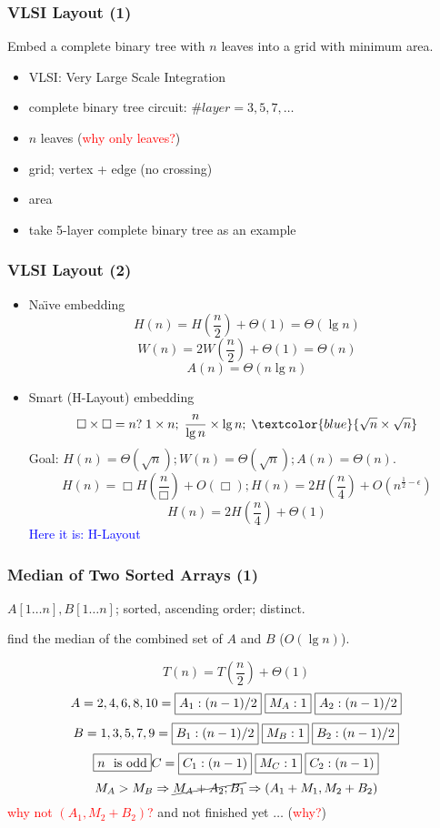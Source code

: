 \documentclass{beamer}
\begin{document}
\begin{frame}
  \frametitle{VLSI Layout (1)}
  
  \begin{Problem}
    Embed a complete binary tree with $n$ leaves into a grid with minimum area.
    \begin{itemize}
      \item VLSI: Very Large Scale Integration
      \item complete binary tree circuit: $\#layer = 3,5,7,\ldots$
      \item $n$ leaves (\textcolor{red}{why only leaves?})
      \item grid; vertex + edge (no crossing)
      \item area
      \item take 5-layer complete binary tree as an example
    \end{itemize}
  \end{Problem}
\end{frame}

\begin{frame}
  \frametitle{VLSI Layout (2)}
  
  \begin{itemize}
    \setlength{\itemsep}{0.50cm}
    \item Na\"{\i}ve embedding
     \[ H(n) = H(\frac{n}{2}) + \Theta(1) = \Theta(\lg n) \]
     \[ W(n) = 2W(\frac{n}{2}) + \Theta(1) = \Theta(n) \]
     \[ A(n) = \Theta(n \lg n) \]
    \item Smart (H-Layout) embedding
    \[ \Box \times \Box = n? \; 1 \times n;\; \frac{n}{\lg n} \times \lg n;\;
    \textcolor{blue}{\sqrt{n} \times \sqrt{n}}
    \]
    Goal: $H(n) = \Theta(\sqrt{n}); W(n) = \Theta(\sqrt{n}); A(n) = \Theta(n).$
    \[ 
      H(n) = \Box H(\frac{n}{\Box}) + O(\Box); H(n) = 2 H(\frac{n}{4}) +
      O(n^{\frac{1}{2} - \epsilon})
    \]
    \[ H(n) = 2H(\frac{n}{4}) + \Theta(1) \]
    \centering \textcolor{blue}{Here it is: H-Layout}
  \end{itemize}
\end{frame}

\begin{frame}
  \frametitle{Median of Two Sorted Arrays (1)}
  
  \begin{Problem}
    $A[1 \ldots n], B[1 \ldots n]$; sorted, ascending order; distinct.
    
    find the median of the combined set of $A$ and $B$ ($O(\lg n)$).
  \end{Problem}
  
  \[ T(n) = T(\frac{n}{2}) + \Theta(1) \]
  \[A = 2,4,6,8,10 = \fbox{$A_1: (n-1)/2$}\; \fbox{$M_A: 1$}\; \fbox{$A_2:
  (n-1)/2$} \] 
  \[B = 1,3,5,7,9 = \fbox{$B_1: (n-1)/2$}\; \fbox{$M_B: 1$}\; \fbox{$B_2:
  (n-1)/2$} \] 
  \[
    \fbox{$n$ \textrm{ is odd}} C = \fbox{$C_1: (n-1)$}\; \fbox{$M_C: 1$}\;
    \fbox{$C_2: (n-1)$}
  \]
  \[
    M_A > M_B \Rightarrow \cancel{M_A + A_2; B_1} \Rightarrow (A_1 + M_1, M_2 +
    B_2)
  \]
  \textcolor{red}{why not $(A_1, M_2 + B_2)$?}
  and not finished yet $\ldots$ (\textcolor{red}{why?})
\end{frame}
\end{document}
